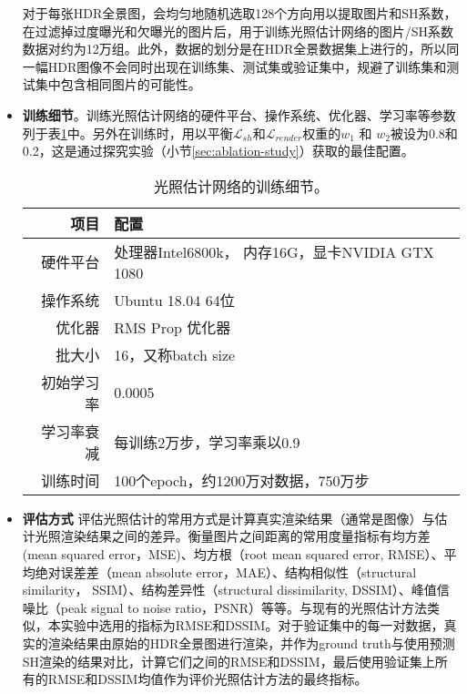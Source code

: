 \begin{itemize}
    对于每张HDR全景图，会均匀地随机选取128个方向用以提取图片和SH系数，在过滤掉过度曝光和欠曝光的图片后，用于训练光照估计网络的图片/SH系数数据对约为12万组。此外，数据的划分是在HDR全景数据集上进行的，所以同一幅HDR图像不会同时出现在训练集、测试集或验证集中，规避了训练集和测试集中包含相同图片的可能性。
    \item \textbf{训练细节}。训练光照估计网络的硬件平台、操作系统、优化器、学习率等参数列于表\ref{table:traning-details}中。另外在训练时，用以平衡$\mathcal{L}_{sh}$和$\mathcal{L}_{render}$权重的$w_1$ 和 $w_2$被设为0.8和0.2，这是通过探究实验（小节\ref{sec:ablation-study}）获取的最佳配置。
    \begin{table}[htbp]
        \centering
        \caption{
            \label{table:traning-details}
            光照估计网络的训练细节。
        }
        \begin{tabular}{r|l}
            \hline
            项目 & 配置\\
            \hline
            硬件平台 & 处理器Intel6800k， 内存16G，显卡NVIDIA GTX 1080\\
            操作系统 & Ubuntu 18.04 64位\\
            优化器    & RMS Prop 优化器\\
            批大小    & 16，又称batch size\\
            初始学习率 & 0.0005 \\
            学习率衰减 & 每训练2万步，学习率乘以0.9\\
            训练时间 & 100个epoch，约1200万对数据，750万步\\
            \hline            
        \end{tabular}
    \end{table}
    \item \textbf{评估方式} 评估光照估计的常用方式是计算真实渲染结果（通常是图像）与估计光照渲染结果之间的差异。衡量图片之间距离的常用度量指标有均方差(mean squared error，MSE)、均方根（root mean squared error, RMSE）、平均绝对误差差（mean absolute  error，MAE）、结构相似性（structural similarity， SSIM）、结构差异性（structural dissimilarity, DSSIM）、峰值信噪比（peak signal to noise ratio，PSNR）等等。与现有的光照估计方法类似，本实验中选用的指标为RMSE和DSSIM。对于验证集中的每一对数据，真实的渲染结果由原始的HDR全景图进行渲染，并作为ground truth与使用预测SH渲染的结果对比，计算它们之间的RMSE和DSSIM，最后使用验证集上所有的RMSE和DSSIM均值作为评价光照估计方法的最终指标。
\end{itemize}
